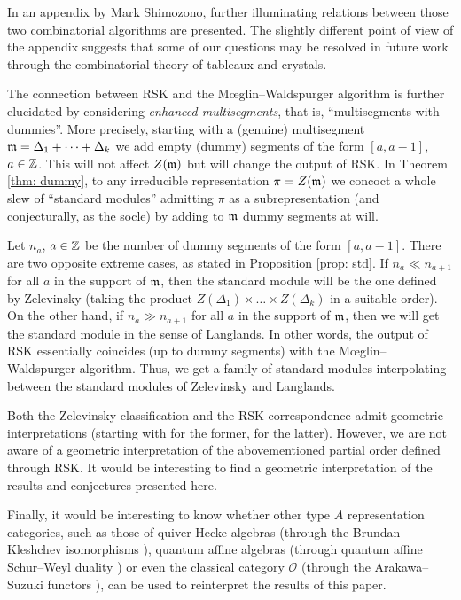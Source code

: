 \documentclass{ert-l} %
\begin{document}
In an appendix by Mark Shimozono, further illuminating relations between those two combinatorial algorithms are presented.
The slightly different point of view of the appendix suggests that some of our questions may be resolved in future work through the combinatorial theory of tableaux and crystals.

The connection between RSK and the M\oe glin--Waldspurger algorithm is further elucidated by considering \textit{enhanced multisegments}, that is, ``multisegments with dummies''.
More precisely, starting with a (genuine) multisegment $\mathfrak{m}=\Delta_1+\dots+\Delta_k$ we add empty (dummy) segments of the form $[a,a-1]$, $a\in\mathbb{Z}$.
This will not affect $Z(\mathfrak{m})$ but will change the output of RSK. In Theorem \ref{thm: dummy}, to any irreducible representation $\pi=Z(\mathfrak{m})$ we
concoct a whole slew of ``standard modules'' admitting $\pi$ as a subrepresentation (and conjecturally, as the socle)
by adding to $\mathfrak{m}$ dummy segments at will.

Let $n_a$, $a\in\mathbb{Z}$ be the number of dummy segments of the form $[a,a-1]$.
There are two opposite extreme cases, as stated in Proposition \ref{prop: std}.
If $n_a\ll n_{a+1}$ for all $a$ in the support of $\mathfrak{m}$, then the standard module
will be the one defined by Zelevinsky (taking the product $Z(\Delta_1)\times\dots\times Z(\Delta_k)$ in a suitable order).
On the other hand, if $n_a\gg n_{a+1}$ for all $a$ in the support of $\mathfrak{m}$, then we will get the standard module in the sense of Langlands.
In other words, the output of RSK essentially coincides (up to dummy segments) with the M\oe glin--Waldspurger algorithm.
Thus, we get a family of standard modules interpolating between the standard modules of Zelevinsky and Langlands.

Both the Zelevinsky classification and the RSK correspondence admit geometric interpretations
(starting with \cites{MR617466, MR783619} for the former, \cites{MR672610, MR929778, MR2979579} for the latter).
However, we are not aware of a geometric interpretation of the abovementioned partial order defined through RSK.
It would be interesting to find a geometric interpretation of the results and conjectures presented here.

Finally, it would be interesting to know whether other type $A$ representation categories, such as those of quiver Hecke algebras (through the Brundan--Kleshchev isomorphisms \cite{MR2551762}),
quantum affine algebras (through quantum affine Schur--Weyl duality \cite{MR1405590}) or even the classical category $\mathcal{O}$
(through the Arakawa--Suzuki functors \cites{MR1652134, MR2320806}), can be used to reinterpret the results of this paper.
\end{document}
